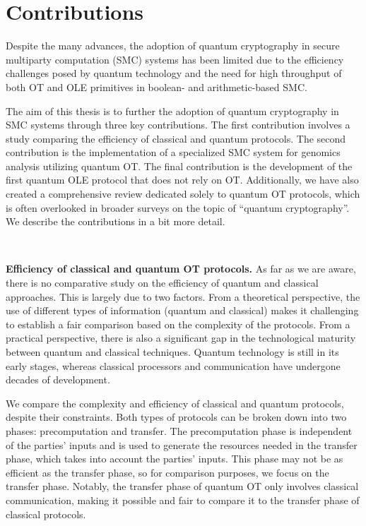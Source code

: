 \section*{Contributions} %

Despite the many advances, the adoption of quantum cryptography in secure multiparty computation (SMC) systems has been limited due to the efficiency challenges posed by quantum technology and the need for high throughput of both OT and OLE primitives in boolean- and arithmetic-based SMC.

The aim of this thesis is to further the adoption of quantum cryptography in SMC systems through three key contributions. The first contribution involves a study comparing the efficiency of classical and quantum protocols. The second contribution is the implementation of a specialized SMC system for genomics analysis utilizing quantum OT. The final contribution is the development of the first quantum OLE protocol that does not rely on OT. Additionally, we have also created a comprehensive review dedicated solely to quantum OT protocols, which is often overlooked in broader surveys on the topic of ``quantum cryptography''. We describe the contributions in a bit more detail.

\

\noindent\textbf{Efficiency of classical and quantum OT protocols.} As far as we are aware, there is no comparative study on the efficiency of quantum and classical approaches. This is largely due to two factors. From a theoretical perspective, the use of different types of information (quantum and classical) makes it challenging to establish a fair comparison based on the complexity of the protocols. From a practical perspective, there is also a significant gap in the technological maturity between quantum and classical techniques. Quantum technology is still in its early stages, whereas classical processors and communication have undergone decades of development.

We compare the complexity and efficiency of classical and quantum protocols, despite their constraints. Both types of protocols can be broken down into two phases: precomputation and transfer. The precomputation phase is independent of the parties' inputs and is used to generate the resources needed in the transfer phase, which takes into account the parties' inputs. This phase may not be as efficient as the transfer phase, so for comparison purposes, we focus on the transfer phase. Notably, the transfer phase of quantum OT only involves classical communication, making it possible and fair to compare it to the transfer phase of classical protocols.


